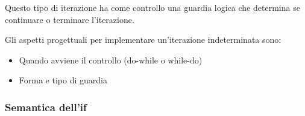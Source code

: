 \documentclass[a4paper]{article}
\begin{document}
\begin{itemize}
\begin{itemize}
        Questo tipo di iterazione ha come controllo una guardia logica che determina
        se continuare o terminare l'iterazione.

        Gli aspetti progettuali per implementare
        un'iterazione indeterminata sono:
        \begin{itemize}
          \item Quando avviene il controllo (do-while o while-do)

          \item Forma e tipo di guardia
        \end{itemize}
    \end{itemize}
\end{itemize}

\subsubsection{Semantica dell'if}
\end{document}
